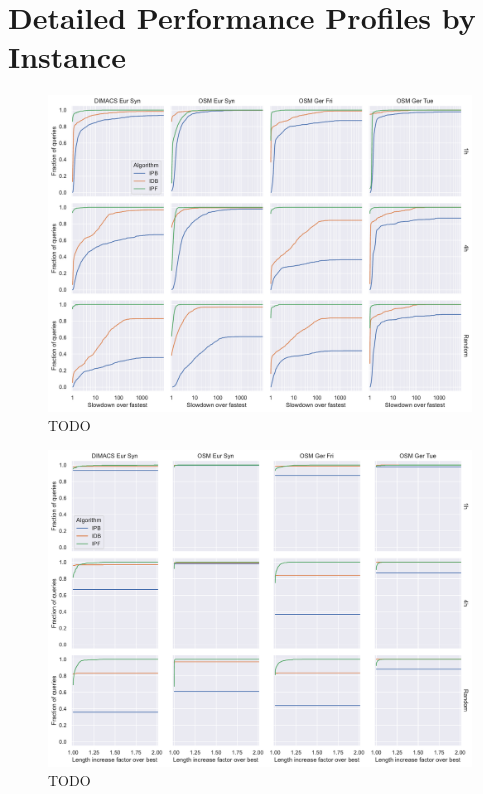 \documentclass[a4paper,UKenglish,cleveref, autoref, thm-restate]{lipics-v2021}
\begin{document}




\appendix

\section{Detailed Performance Profiles by Instance}\label{sec:perf_profile_instance}

\begin{figure}
\centering
\includegraphics[width=.95\linewidth]{fig/detailed_perf_profile_time.pdf}
\caption{
TODO
}\label{fig:perf_profile_time}
\end{figure}

\begin{figure}
\centering
\includegraphics[width=.95\linewidth]{fig/detailed_perf_profile_quality.pdf}
\caption{
TODO
}\label{fig:perf_profile_quality}
\end{figure}
\end{document}
